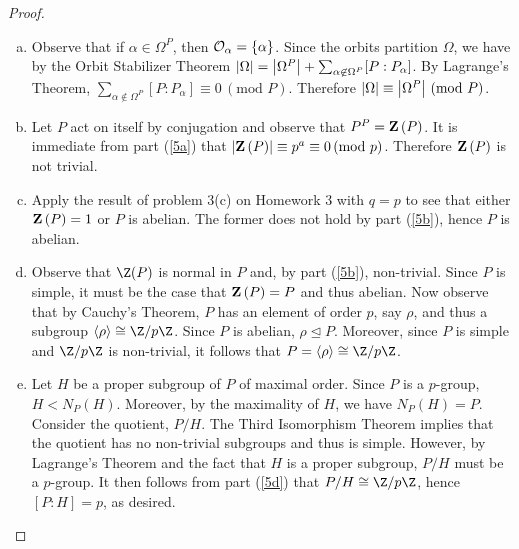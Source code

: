 \documentclass[10pt]{amsart}
\begin{document}
\begin{thm}
  
  \begin{proof}
    \begin{enumerate}[(a)]
      \item\label{5a}
        Observe that if $\alpha \in \Omega^P$, then $\mathcal{O}_{\alpha} = \left\{\alpha\right\}$.
        Since the orbits partition $\Omega$, we have by the Orbit Stabilizer Theorem $\left| \Omega \right| = \left| \Omega^P \right| + \sum_{\alpha \not \in \Omega^P} [P : P_\alpha]$.
        By Lagrange's Theorem, $\sum_{\alpha \not \in \Omega^P} [P : P_\alpha] \equiv 0\, (\text{mod }P)$.
        Therefore $\left| \Omega \right| \equiv \left| \Omega^P \right|\, (\text{mod } P)$.
      \item\label{5b}
        Let $P$ act on itself by conjugation and observe that $P^P = \mathbf{Z}\left(P\right)$.
        It is immediate from part (\ref{5a}) that $\left| \mathbf{Z}\left(P\right) \right| \equiv p^a \equiv 0 \, (\text{mod } p)$.
        Therefore $\mathbf{Z}\left(P\right)$ is not trivial.
      \item\label{5c}
        Apply the result of problem 3(c) on Homework 3 with $q = p$ to see that either $\mathbf{Z}\left(P\right) = 1$ or $P$ is abelian.
        The former does not hold by part (\ref{5b}), hence $P$ is abelian.
      \item\label{5d}
        Observe that $\Z(P)$ is normal in $P$ and, by part (\ref{5b}), non-trivial.
        Since $P$ is simple, it must be the case that $\mathbf{Z}\left(P\right) = P$ and thus abelian.
        Now observe that by Cauchy's Theorem, $P$ has an element of order $p$, say $\rho$, and thus a subgroup $\left<\rho\right> \cong \Z/p\Z$.
        Since $P$ is abelian, $\rho \unlhd P$.
        Moreover, since $P$ is simple and $\Z/p\Z$ is non-trivial, it follows that  $P = \left<\rho\right> \cong \Z/p\Z$.
      \item\label{5e}
        Let $H$ be a proper subgroup of $P$ of maximal order.
        Since $P$ is a $p$-group, $H < N_P(H)$.
        Moreover, by the maximality of $H$, we have $N_P(H) = P$.
        Consider the quotient, $P/H$.
        The Third Isomorphism Theorem implies that the quotient has no non-trivial subgroups and thus is simple.
        However, by Lagrange's Theorem and the fact that $H$ is a proper subgroup, $P/H$ must be a $p$-group.
        It then follows from part (\ref{5d}) that $P/H \cong \Z/p\Z$, hence $[P:H] = p$, as desired. 
    \end{enumerate}
  \end{proof}
\end{thm}
\end{document}

